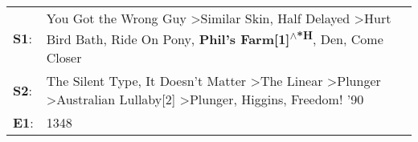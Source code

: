 \begin{supertabular}{p{0.03\textwidth}p{0.92\textwidth}}
 \textbf{S1}:  &    You Got the Wrong Guy\textsuperscript{} \textgreater \enspace Similar Skin\textsuperscript{}, \enspace Half Delayed\textsuperscript{} \textgreater \enspace Hurt Bird Bath\textsuperscript{}, \enspace Ride On Pony\textsuperscript{}, \enspace \textbf{Phil's Farm[1]\textsuperscript{$\wedge$*H}}, \enspace Den\textsuperscript{}, \enspace Come Closer\textsuperscript{}  \enspace  \\
 \textbf{S2}:  &  The Silent Type\textsuperscript{}, \enspace It Doesn't Matter\textsuperscript{} \textgreater \enspace The Linear\textsuperscript{} \textgreater \enspace Plunger\textsuperscript{} \textgreater \enspace Australian Lullaby[2]\textsuperscript{} \textgreater \enspace Plunger\textsuperscript{}, \enspace Higgins\textsuperscript{}, \enspace Freedom! '90\textsuperscript{}  \enspace  \\
 \textbf{E1}:  &                                                                                                                                                                                                                                                                                                                                                         1348\textsuperscript{}  \enspace  \\
\end{supertabular}
